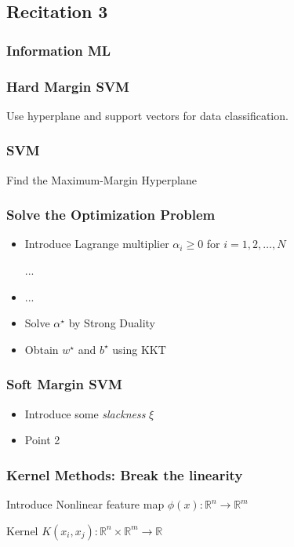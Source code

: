 \subsection {Recitation 3}

\subsubsection{Information ML}

\subsubsection{Hard Margin SVM}

Use hyperplane  and support vectors for data classification.

\subsubsection{SVM}
Find the Maximum-Margin Hyperplane

\subsubsection{Solve the Optimization Problem}
\begin{itemize}
	\item Introduce Lagrange multiplier $\alpha_i \ge 0$ for $i=1,2,\dots,N$

	      ...

	\item ...
	\item  Solve  $\alpha^\star$ by Strong Duality
	\item Obtain $w^{\star}$ and $b^{\star}$ using KKT

\end{itemize}

\subsubsection{Soft Margin SVM}
\begin{itemize}
	\item Introduce some \textit{slackness} $\xi$
	\item Point 2
\end{itemize}

\subsubsection{Kernel Methods: Break the linearity}
Introduce  Nonlinear feature map $\phi(x): \mathbb{R}^{n}\rightarrow \mathbb{R}^{m}$

Kernel $K(x_i,x_j): \mathbb{R}^{n} \times \mathbb{R}^{m}\rightarrow \mathbb{R}$


